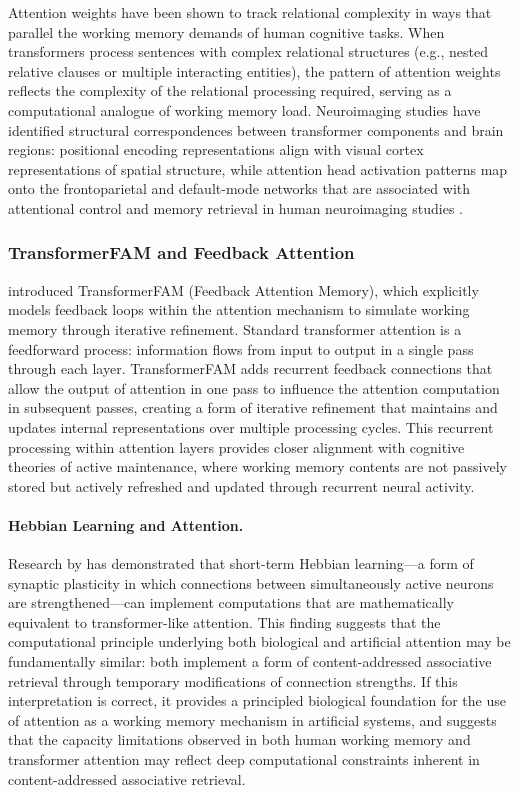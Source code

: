 Attention weights have been shown to track relational complexity in ways that parallel the working memory demands of human cognitive tasks. When transformers process sentences with complex relational structures (e.g., nested relative clauses or multiple interacting entities), the pattern of attention weights reflects the complexity of the relational processing required, serving as a computational analogue of working memory load. Neuroimaging studies have identified structural correspondences between transformer components and brain regions: positional encoding representations align with visual cortex representations of spatial structure, while attention head activation patterns map onto the frontoparietal and default-mode networks that are associated with attentional control and memory retrieval in human neuroimaging studies \citep{nikolaev2025aligning}.

\subsubsection{TransformerFAM and Feedback Attention}

\citet{irie2024transformerfam} introduced TransformerFAM (Feedback Attention Memory), which explicitly models feedback loops within the attention mechanism to simulate working memory through iterative refinement. Standard transformer attention is a feedforward process: information flows from input to output in a single pass through each layer. TransformerFAM adds recurrent feedback connections that allow the output of attention in one pass to influence the attention computation in subsequent passes, creating a form of iterative refinement that maintains and updates internal representations over multiple processing cycles. This recurrent processing within attention layers provides closer alignment with cognitive theories of active maintenance, where working memory contents are not passively stored but actively refreshed and updated through recurrent neural activity.

\paragraph{Hebbian Learning and Attention.} Research by \citet{kozachkov2022hebbian} has demonstrated that short-term Hebbian learning---a form of synaptic plasticity in which connections between simultaneously active neurons are strengthened---can implement computations that are mathematically equivalent to transformer-like attention. This finding suggests that the computational principle underlying both biological and artificial attention may be fundamentally similar: both implement a form of content-addressed associative retrieval through temporary modifications of connection strengths. If this interpretation is correct, it provides a principled biological foundation for the use of attention as a working memory mechanism in artificial systems, and suggests that the capacity limitations observed in both human working memory and transformer attention may reflect deep computational constraints inherent in content-addressed associative retrieval.

